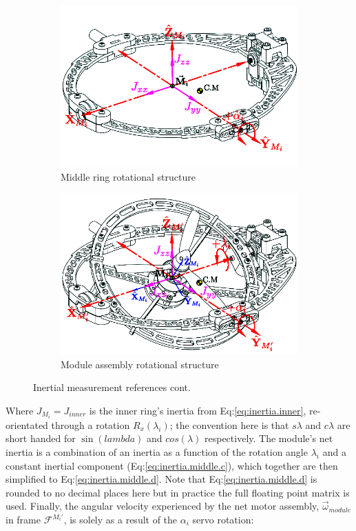 \begin{figure}[htbp]
\begin{subfigure}{0.49\textwidth}
\includegraphics[width=\textwidth]{figs/inertia-middle}
\caption{Middle ring rotational structure}
\label{fig:inertia-middle}
\end{subfigure}
\begin{subfigure}{0.49\textwidth}
\includegraphics[width=\textwidth]{figs/inertia-module}
\caption{Module assembly rotational structure}
\label{fig:inertia-module}
\end{subfigure}
\caption{Inertial measurement references cont.}
\vspace{-20pt}
\end{figure}
\par
Where $J_{M_i}=J_{inner}$ is the inner ring's inertia from Eq:\ref{eq:inertia.inner}, re-orientated through a rotation $R_x(\lambda_i)$; the convention here is that $s\lambda$ and $c\lambda$ are short handed for $\sin(lambda)$ and $cos(\lambda)$ respectively. The module's net inertia is a combination of an inertia as a function of the rotation angle $\lambda_i$ and a constant inertial component (Eq:\ref{eq:inertia.middle.c}), which together are then simplified to Eq:\ref{eq:inertia.middle.d}. Note that Eq:\ref{eq:inertia.middle.d} is rounded to no decimal places here but in practice the full floating point matrix is used. Finally, the angular velocity experienced by the net motor assembly, $\vec{\omega}_{module}$ in frame $\mathcal{F}^{M_i'}$, is solely as a result of the $\alpha_i$ servo rotation:
